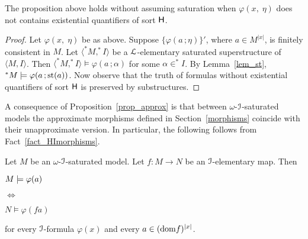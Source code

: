 \documentclass[10pt,oneside]{amsproc}
\begin{document}

\def\ceq#1#2#3{\parbox[t]{20ex}{$\displaystyle #1$}\parbox{5ex}{\hfil $#2$}{$\displaystyle #3$}}

\begin{remark}\label{remk_approx_EH_free}
  The proposition above holds without assuming saturation when $\varphi(x,\;\eta)$ does not contains existential quantifiers of sort ${\sf H}$.
\end{remark}

\begin{proof}
  Let $\varphi(x,\;\eta)$ be as above.
  Suppose $\{\varphi(a\,;\eta)\}'$, where $a\in M^{|x|}$, is finitely consistent in $M$.
  Let $\langle ^*M,^*I\rangle$ be a ${\EuScript L}$-elementary saturated superstructure of $\langle M,I\rangle$.
  Then $\langle ^*M,^*I\rangle\models\varphi(a\,;\alpha)$ for some $\alpha\in ^*I$.
  By Lemma~\ref{lem_st}, $^*M\models\varphi(a\,;{\rm st}(a))$.
  Now observe that the truth of formulas without  existential quantifiers of sort ${\sf H}$ is preserved by substructures.
\end{proof}

A consequence of Proposition~\ref{prop_approx} is that between $\omega$-${\EuScript I}$-saturated models the approximate morphisms defined in Section~\ref{morphisms} coincide with their unapproximate version.
In particular, the following follows from Fact~\ref{fact_HImorphisms}.

\begin{corollary}\label{corol_omega_sat}
  Let $M$ be an $\omega$-${\EuScript I}$-saturated model.
  Let $f:M\to N$ be an ${\EuScript I}$-elementary map.
  Then

  \ceq{\hfill M\models\varphi(a)}{\Leftrightarrow}{N\models\varphi(fa)}

  for every ${\EuScript I}$-formula $\varphi(x)$ and every $a\in({\rm dom }f)^{|x|}$.
\end{corollary}  



\end{document}
